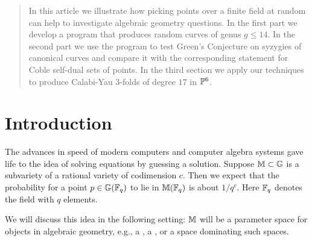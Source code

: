 \newcommand{\gm}{\mathfrak m}
\newcommand{\gM}{\mathfrak M}
\newcommand{\integer}{\ZZ}
\newcommand{\proj}{\PP}
\newcommand{\complex}{\CC}
\newcommand{\real}{\mathbb R}
\newcommand{\gp}{\mathfrak p}
\newcommand{\gq}{\mathfrak q}

\tabcolsep 3pt



\newcommand{\by}{}
\newcommand{\paper}{: \begin{it}}
\newcommand{\jour }{, \end{it}}
\newcommand{\vol}{\begin{bf} }
\newcommand{\yr}{\end{bf}(}
\newcommand{\pages}{),}

\maketitle

\begin{abstract} In this article we illustrate how picking points
over a finite field at random 
can help to investigate algebraic geometry questions.
In the first part we develop a program that produces random
curves of genus $g \le 14$. In the second part we use the program to test
Green's Conjecture on syzygies of canonical curves and compare 
it with the corresponding statement for Coble self-dual sets of
points.
In the third section we apply our techniques to produce Calabi-Yau
3-folds of degree $17$ in ${\mathbb P}^6$.     
\end{abstract}

\section*{Introduction}

The advances in speed of modern computers and computer algebra systems gave 
life to the idea of solving equations by guessing a solution.
Suppose ${\mathbb M} \subset {\mathbb G}$ is a subvariety of a rational variety
of codimension $c$. 
Then we expect that the probability for a point $p \in {\mathbb G}({\mathbb F}_q)$ to lie in 
${\mathbb M}({\mathbb F}_q)$ is about $1/q^c$. 
Here ${\mathbb F}_q$ denotes the field with $q$ elements.  

We will discuss this idea in the following setting: 
${\mathbb M}$ will be a parameter space for objects in algebraic geometry, e.g.,
a , a , or a space dominating such spaces.

